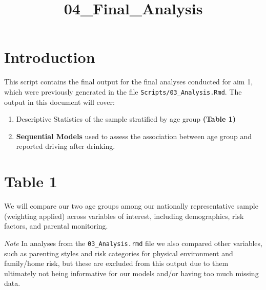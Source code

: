 \documentclass[
]{article}
\title{04\_Final\_Analysis}
\author{}
\date{\vspace{-2.5em}}
\providecommand{\tightlist}{%
  \setlength{\itemsep}{0pt}\setlength{\parskip}{0pt}}
\begin{document}
\maketitle

{
\setcounter{tocdepth}{3}
\tableofcontents
}
\section{Introduction}\label{introduction}

This script contains the final output for the final analyses conducted
for aim 1, which were previously generated in the file
\texttt{Scripts/03\_Analysis.Rmd}. The output in this document will
cover:

\begin{enumerate}
\def\labelenumi{\arabic{enumi}.}
\tightlist
\item
  Descriptive Statistics of the sample stratified by age group
  \textbf{(Table 1)}
\item
  \textbf{Sequential Models} used to assess the association between age
  group and reported driving after drinking.
\end{enumerate}

\section{Table 1}\label{table-1}

We will compare our two age groups among our nationally representative
sample (weighting applied) across variables of interest, including
demographics, risk factors, and parental monitoring.

\emph{Note} In analyses from the \texttt{03\_Analysis.rmd} file we also
compared other variables, such as parenting styles and risk categories
for physical environment and family/home risk, but these are excluded
from this output due to them ultimately not being informative for our
models and/or having too much missing data.
\end{document}

